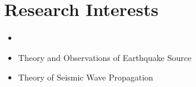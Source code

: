 \section{Research Interests}

\begin{itemize}
\item 
\item Theory and Observations of Earthquake Source
\item Theory of Seismic Wave Propagation
\end{itemize}
